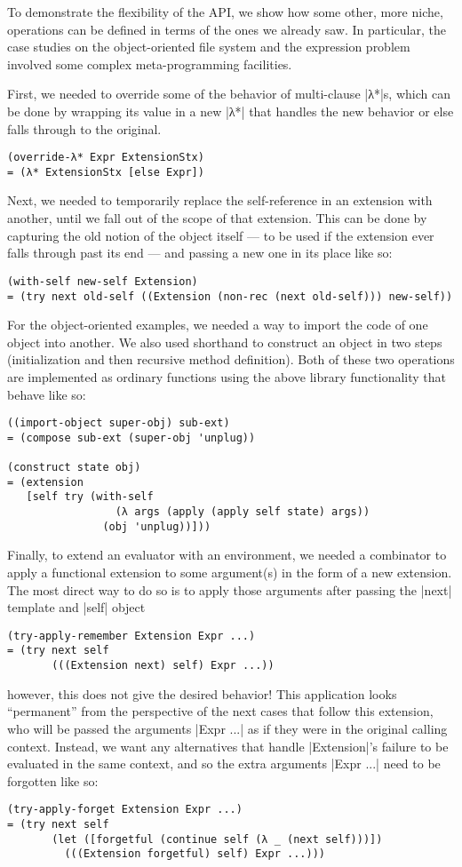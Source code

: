 To demonstrate the flexibility of the API, we show how some other, more niche, operations can be defined in terms of the ones we already saw.
In particular, the case studies on the object-oriented file system and the expression problem involved some complex meta-programming facilities.

First, we needed to override some of the behavior of multi-clause \scm|λ*|s, which can be done by wrapping its value in a new \scm|λ*| that handles the new behavior or else falls through to the original.
\begin{verbatim}
(override-λ* Expr ExtensionStx)
= (λ* ExtensionStx [else Expr])
\end{verbatim}
Next, we needed to temporarily replace the self-reference in an extension with another, until we fall out of the scope of that extension.
This can be done by capturing the old notion of the object itself --- to be used if the extension ever falls through past its end --- and passing a new one in its place like so:
\begin{verbatim}
(with-self new-self Extension)
= (try next old-self ((Extension (non-rec (next old-self))) new-self))
\end{verbatim}

For the object-oriented examples, we needed a way to import the code of one object into another.
We also used shorthand to construct an object in two steps (initialization and then recursive method definition).
Both of these two operations are implemented as ordinary functions using the above library functionality that behave like so:
\begin{verbatim}
((import-object super-obj) sub-ext)
= (compose sub-ext (super-obj 'unplug))

(construct state obj)
= (extension
   [self try (with-self
                 (λ args (apply (apply self state) args))
               (obj 'unplug))]))
\end{verbatim}

Finally, to extend an evaluator with an environment, we needed a combinator to apply a functional extension to some argument(s) in the form of a new extension.
The most direct way to do so is to apply those arguments after passing the \scm|next| template and \scm|self| object
\begin{verbatim}
(try-apply-remember Extension Expr ...)
= (try next self
       (((Extension next) self) Expr ...))
\end{verbatim}
however, this does not give the desired behavior!
This application looks ``permanent'' from the perspective of the next cases that follow this extension, who will be passed the arguments \scm|Expr ...| as if they were in the original calling context.
Instead, we want any alternatives that handle \scm|Extension|'s failure to be evaluated in the same context, and so the extra arguments \scm|Expr ...| need to be forgotten like so:
\begin{verbatim}
(try-apply-forget Extension Expr ...)
= (try next self
       (let ([forgetful (continue self (λ _ (next self)))])
         (((Extension forgetful) self) Expr ...)))
\end{verbatim}



